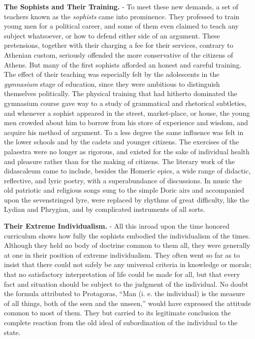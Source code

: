 \documentclass[
]{book}
\begin{document}
\textbf{The Sophists and Their Training.} - To meet these new demands, a set of teachers known as the \emph{sophists} came into prominence. They professed to train young men for a political career, and some of them even claimed to teach any subject whatsoever, or how to defend either side of an argument. These pretensions, together with their charging a fee for their services, contrary to Athenian custom, seriously offended the more conservative of the citizens of Athens. But many of the first sophists afforded an honest and careful training. The effect of their teaching was especially felt by the adolescents in the \emph{gymnasium} stage of education, since they were ambitious to distinguish themselves politically. The physical training that had hitherto dominated the gymnasium course gave way to a study of grammatical and rhetorical subtleties, and whenever a sophist appeared in the street, market-place, or house, the young men crowded about him to borrow from his store of experience and wisdom, and acquire his method of argument. To a less degree the same influence was felt in the lower schools and by the cadets and younger citizens. The exercises of the palaestra were no longer as rigorous, and existed for the sake of individual health and pleasure rather than for the making of citizens. The literary work of the didascaleum came to include, besides the Homeric epics, a wide range of didactic, reflective, and lyric poetry, with a superabundance of discussions. In music the old patriotic and religious songs sung to the simple Doric airs and accompanied upon the sevenstringed lyre, were replaced by rhythms of great difficulty, like the Lydian and Phrygian, and by complicated instruments of all sorts.

\textbf{Their Extreme Individualism.} - All this inroad upon the time honored curriculum shows how fully the sophists embodied the individualism of the times. Although they held no body of doctrine common to them all, they were generally at one in their position of extreme individualism. They often went so far as to insist that there could not safely be any universal criteria in knowledge or morals; that no satisfactory interpretation of life could be made for all, but that every fact and situation should be subject to the judgment of the individual. No doubt the formula attributed to Protagoras, ``Man (i. e. the individual) is the measure of all things, both of the seen and the unseen,'' would have expressed the attitude common to most of them. They but carried to its legitimate conclusion the complete reaction from the old ideal of subordination of the individual to the state.
\end{document}
